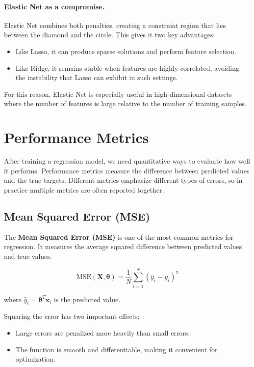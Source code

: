 \documentclass{article}
\newcommand{\vecb}[1]{\boldsymbol{#1}} %
\newcommand{\matb}[1]{\mathbf{#1}}     %
\newcommand{\vb}[1]{\mathbf{#1}}       %
\begin{document}
\paragraph{Elastic Net as a compromise.}
Elastic Net combines both penalties, creating a constraint region that lies between the diamond and the circle. This gives it two key advantages:

\begin{itemize}
    \item Like Lasso, it can produce sparse solutions and perform feature selection.
    \item Like Ridge, it remains stable when features are highly correlated, avoiding the instability that Lasso can exhibit in such settings.
\end{itemize}

For this reason, Elastic Net is especially useful in high-dimensional datasets where the number of features is large relative to the number of training samples.



\section{Performance Metrics}

After training a regression model, we need quantitative ways to evaluate how well it performs. 
Performance metrics measure the difference between predicted values and the true targets. 
Different metrics emphasize different types of errors, so in practice multiple metrics are often reported together.

\subsection{Mean Squared Error (MSE)}

The \textbf{Mean Squared Error (MSE)} is one of the most common metrics for regression.  
It measures the average squared difference between predicted values and true values.

\[
\text{MSE}(\matb{X},\vecb{\theta})=\frac{1}{N}\sum_{i=1}^{N}(\hat{y}_i-y_i)^2
\]

where $\hat{y}_i=\vecb{\theta}^T\vb{x}_i$ is the predicted value.

Squaring the error has two important effects:

\begin{itemize}
\item Large errors are penalized more heavily than small errors.
\item The function is smooth and differentiable, making it convenient for optimization.
\end{itemize}
\end{document}
